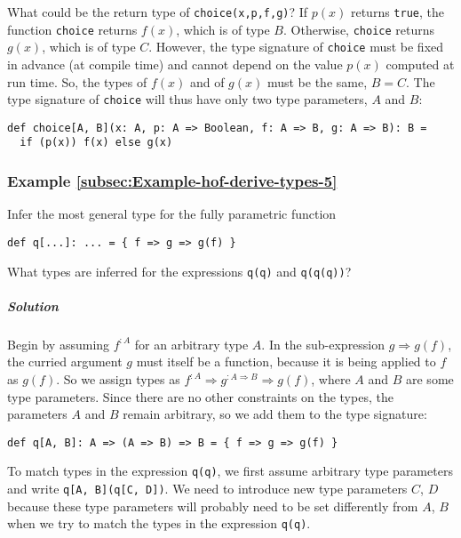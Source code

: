What could be the return type of \lstinline!choice(x,p,f,g)!?
If $p(x)$ returns \lstinline!true!,
the function \lstinline!choice!
returns $f(x)$, which is of type $B$. Otherwise, \lstinline!choice!
returns $g(x)$, which is of type $C$. However, the type signature
of \lstinline!choice! must
be fixed in advance (at compile time) and cannot depend on the value
$p(x)$ computed at run time. So, the types of $f(x)$ and of $g(x)$
must be the same, $B=C$. The type signature of \lstinline!choice!
will thus have only two type parameters, $A$ and $B$:
\begin{lstlisting}
def choice[A, B](x: A, p: A => Boolean, f: A => B, g: A => B): B =
  if (p(x)) f(x) else g(x)
\end{lstlisting}

\subsubsection{Example \label{subsec:Example-hof-derive-types-5}\ref{subsec:Example-hof-derive-types-5}}

Infer the most general type for the fully parametric function
\begin{lstlisting}
def q[...]: ... = { f => g => g(f) }
\end{lstlisting}
What types are inferred for the expressions \lstinline!q(q)!
and \lstinline!q(q(q))!?

\subparagraph{Solution}

Begin by assuming $f^{:A}$ for an arbitrary type $A$. In the sub-expression
$g\Rightarrow g(f)$, the curried argument $g$ must itself be a function,
because it is being applied to $f$ as $g(f)$. So we assign types
as $f^{:A}\Rightarrow g^{:A\Rightarrow B}\Rightarrow g(f)$, where
$A$ and $B$ are some type parameters. Since there are no other constraints
on the types, the parameters $A$ and $B$ remain arbitrary, so we
add them to the type signature:
\begin{lstlisting}
def q[A, B]: A => (A => B) => B = { f => g => g(f) }
\end{lstlisting}
To match types in the expression \lstinline!q(q)!,
we first assume arbitrary type parameters and write \lstinline!q[A, B](q[C, D])!.
We need to introduce new type parameters $C$, $D$ because these
type parameters will probably need to be set differently from $A$,
$B$ when we try to match the types in the expression \lstinline!q(q)!.

